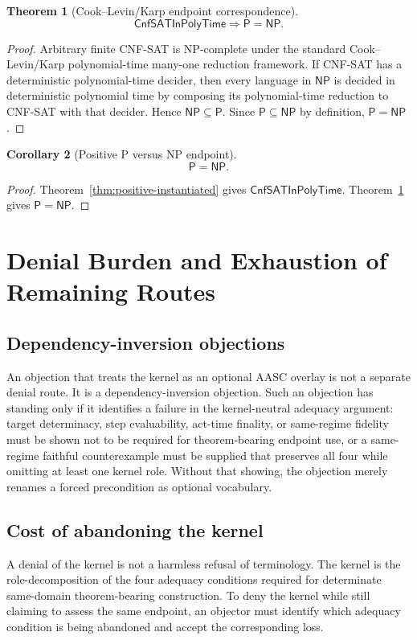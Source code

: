 \documentclass[11pt]{article}
\newtheorem{theorem}{Theorem}[section]
\newtheorem{corollary}[theorem]{Corollary}
\theoremstyle{definition}
\theoremstyle{remark}
\newcommand{\CnfSATP}{\mathsf{CnfSATInPolyTime}}
\newcommand{\Pclass}{\mathsf{P}}
\newcommand{\NPclass}{\mathsf{NP}}
\begin{document}
\begin{theorem}[Cook--Levin/Karp endpoint correspondence]\label{cor:pnp}
\[
  \CnfSATP\Rightarrow \Pclass=\NPclass.
\]
\end{theorem}

\begin{proof}
Arbitrary finite CNF-SAT is NP-complete under the standard Cook--Levin/Karp polynomial-time many-one reduction framework. If CNF-SAT has a deterministic polynomial-time decider, then every language in \(\NPclass\) is decided in deterministic polynomial time by composing its polynomial-time reduction to CNF-SAT with that decider. Hence \(\NPclass\subseteq\Pclass\). Since \(\Pclass\subseteq\NPclass\) by definition, \(\Pclass=\NPclass\).
\end{proof}

\begin{corollary}[Positive P versus NP endpoint]\label{cor:pnp-final}
\[
  \Pclass=\NPclass.
\]
\end{corollary}

\begin{proof}
Theorem~\ref{thm:positive-instantiated} gives \(\CnfSATP\). Theorem~\ref{cor:pnp} gives \(\Pclass=\NPclass\).
\end{proof}


\section{Denial Burden and Exhaustion of Remaining Routes}\label{sec:denial-burden}

\subsection*{Dependency-inversion objections}
An objection that treats the kernel as an optional AASC overlay is not a separate denial route. It is a dependency-inversion objection. Such an objection has standing only if it identifies a failure in the kernel-neutral adequacy argument: target determinacy, step evaluability, act-time finality, or same-regime fidelity must be shown not to be required for theorem-bearing endpoint use, or a same-regime faithful counterexample must be supplied that preserves all four while omitting at least one kernel role. Without that showing, the objection merely renames a forced precondition as optional vocabulary.

\subsection*{Cost of abandoning the kernel}
A denial of the kernel is not a harmless refusal of terminology. The kernel is the role-decomposition of the four adequacy conditions required for determinate same-domain theorem-bearing construction. To deny the kernel while still claiming to assess the same endpoint, an objector must identify which adequacy condition is being abandoned and accept the corresponding loss.
\end{document}
